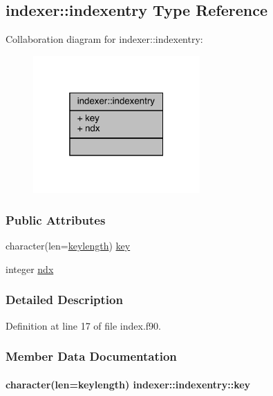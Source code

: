 \hypertarget{structindexer_1_1indexentry}{\subsection{indexer\-:\-:indexentry Type Reference}
\label{structindexer_1_1indexentry}
}


Collaboration diagram for indexer\-:\-:indexentry\-:
\nopagebreak
\begin{figure}[H]
\begin{center}
\leavevmode
\includegraphics[width=181pt]{structindexer_1_1indexentry__coll__graph}
\end{center}
\end{figure}
\subsubsection*{Public Attributes}
\begin{DoxyCompactItemize}
\item 
character(len=\hyperlink{classindexer_a7d27658efaa0adbd2ff73e05efd3e12d}{keylength}) \hyperlink{structindexer_1_1indexentry_a91ec1ce5244d40b07ad061fe8c44830d}{key}
\item 
integer \hyperlink{structindexer_1_1indexentry_a66eef07d27b9f348c73f906de1f8298b}{ndx}
\end{DoxyCompactItemize}


\subsubsection{Detailed Description}


Definition at line 17 of file index.\-f90.



\subsubsection{Member Data Documentation}
\hypertarget{structindexer_1_1indexentry_a91ec1ce5244d40b07ad061fe8c44830d}{
\paragraph[{key}]{\setlength{\rightskip}{0pt plus 5cm}character(len={\bf keylength}) indexer\-::indexentry\-::key}}\label{structindexer_1_1indexentry_a91ec1ce5244d40b07ad061fe8c44830d}


